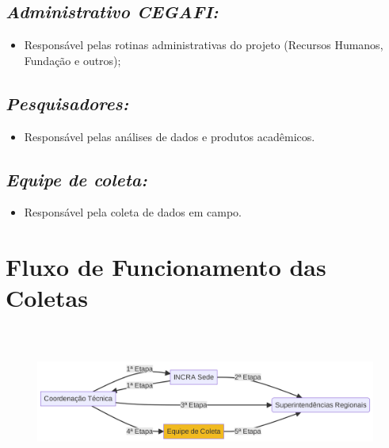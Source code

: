 \documentclass[
  letterpaper,
]{report}
\providecommand{\tightlist}{%
  \setlength{\itemsep}{0pt}\setlength{\parskip}{0pt}}\usepackage{longtable,booktabs,array}
\begin{document}
\hypertarget{administrativo-cegafi}{%
\subsection{\texorpdfstring{\emph{Administrativo
CEGAFI:}}{Administrativo CEGAFI:}}\label{administrativo-cegafi}}

\begin{itemize}
\tightlist
\item
  Responsável pelas rotinas administrativas do projeto (Recursos
  Humanos, Fundação e outros);
\end{itemize}

\hypertarget{pesquisadores}{%
\subsection{\texorpdfstring{\emph{Pesquisadores:}}{Pesquisadores:}}\label{pesquisadores}}

\begin{itemize}
\tightlist
\item
  Responsável pelas análises de dados e produtos acadêmicos.
\end{itemize}

\hypertarget{equipe-de-coleta}{%
\subsection{\texorpdfstring{\emph{Equipe de
coleta:}}{Equipe de coleta:}}\label{equipe-de-coleta}}

\begin{itemize}
\tightlist
\item
  Responsável pela coleta de dados em campo.
\end{itemize}

\hypertarget{fluxo-de-funcionamento-das-coletas}{%
\section{Fluxo de Funcionamento das
Coletas}\label{fluxo-de-funcionamento-das-coletas}}

\begin{figure}[H]

{\centering \includegraphics[width=8.08in,height=1.92in]{./3-metodologia_files/figure-latex/mermaid-figure-2.png}

}

\end{figure}
\end{document}
